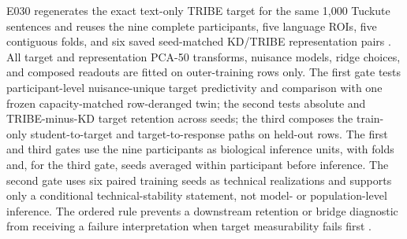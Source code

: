 E030 regenerates the exact text-only TRIBE target for the same 1,000 Tuckute sentences and reuses the nine complete participants, five language ROIs, five contiguous folds, and six saved seed-matched KD/TRIBE representation pairs .
All target and representation PCA-50 transforms, nuisance models, ridge choices, and composed readouts are fitted on outer-training rows only.
The first gate tests participant-level nuisance-unique target predictivity and comparison with one frozen capacity-matched row-deranged twin; the second tests absolute and TRIBE-minus-KD target retention across seeds; the third composes the train-only student-to-target and target-to-response paths on held-out rows.
The first and third gates use the nine participants as biological inference units, with folds and, for the third gate, seeds averaged within participant before inference.
The second gate uses six paired training seeds as technical realizations and supports only a conditional technical-stability statement, not model- or population-level inference.
The ordered rule prevents a downstream retention or bridge diagnostic from receiving a failure interpretation when target measurability fails first .
